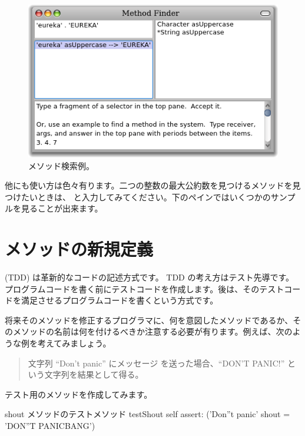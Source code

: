 \documentclass[a4paper,10pt,twoside]{book}
\begin{document}
\begin{figure}[hbt]
\centerline {\includegraphics[width=\textwidth]{MethodFinder-example1}}
\caption{メソッド検索例。
}
\end{figure}

他にも使い方は色々有ります。二つの整数の最大公約数を見つけるメソッドを見つけたいときは、 と入力してみてください。下のペインではいくつかのサンプルを見ることが出来ます。

\section{メソッドの新規定義}

\cite{Beck03a} (TDD) は革新的なコードの記述方式です。
TDD の考え方はテスト先導です。プログラムコードを書く前にテストコードを作成します。後は、そのテストコードを満足させるプログラムコードを書くという方式です。

将来そのメソッドを修正するプログラマに、何を意図したメソッドであるか、そのメソッドの名前は何を付けるべきか注意する必要が有ります。例えば、次のような例を考えてみましょう。

\begin{quote}
文字列 ``Don't panic'' にメッセージ  を送った場合、``DON'T PANIC!'' という文字列を結果として得る。
\end{quote}

\noindent
テスト用のメソッドを作成してみます。

\begin{method}[testShout]{shout メソッドのテストメソッド}
testShout
	self assert: ('Don''t panic' shout = 'DON''T PANICBANG')
\end{method} %
\end{document}
